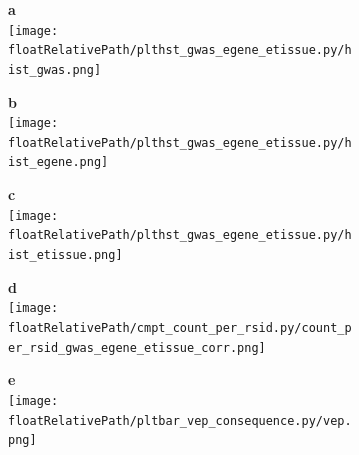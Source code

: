 \begin{figure}[!ht]
    \centering
    \begin{subfigure}[]{.49\textwidth}
        \textbf{a}
        \\
        \texttt{[image: \\floatRelativePath/plthst\_gwas\_egene\_etissue.py/hist\_gwas.png]}
    \end{subfigure}
    \begin{subfigure}[]{.49\textwidth}
        \textbf{b}
        \\
        \texttt{[image: \\floatRelativePath/plthst\_gwas\_egene\_etissue.py/hist\_egene.png]}
    \end{subfigure}

    \begin{subfigure}[]{.49\textwidth}
        \textbf{c}
        \\
        \texttt{[image: \\floatRelativePath/plthst\_gwas\_egene\_etissue.py/hist\_etissue.png]}
    \end{subfigure}
    \begin{subfigure}[]{.49\textwidth}
        \textbf{d}
        \\
        \texttt{[image: \\floatRelativePath/cmpt\_count\_per\_rsid.py/count\_per\_rsid\_gwas\_egene\_etissue\_corr.png]}
    \end{subfigure}

    \begin{subfigure}[]{.49\textwidth}
        \textbf{e}
        \\
        \texttt{[image: \\floatRelativePath/pltbar\_vep\_consequence.py/vep.png]}
    \end{subfigure}

    \caption{}

\end{figure}

%
%

